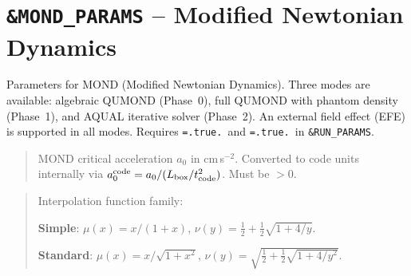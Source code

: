 \section{\texttt{\&MOND\_PARAMS} -- Modified Newtonian Dynamics}
\label{sec:mond_params}

Parameters for MOND (Modified Newtonian Dynamics).  Three modes
are available: algebraic QUMOND (Phase~0), full QUMOND with phantom
density (Phase~1), and AQUAL iterative solver (Phase~2).
An external field effect (EFE) is supported in all modes.
Requires \texttt{=.true.}\ and
\texttt{=.true.}\ in \texttt{\&RUN\_PARAMS}.

\label{param:a0_mond}

\begin{quote}
MOND critical acceleration $a_0$ in cm\,s$^{-2}$.  Converted to code
units internally via $a_0^{\rm code} = a_0 / (L_{\rm box}/t_{\rm code}^2)$.
Must be $> 0$.
\end{quote}

\label{param:mond_mu_type}

\begin{quote}
Interpolation function family:
\begin{description}[style=nextline,leftmargin=2cm,font=\ttfamily]
  \item[1] \textbf{Simple}: $\mu(x) = x/(1+x)$, \;
    $\nu(y) = \tfrac{1}{2} + \tfrac{1}{2}\sqrt{1 + 4/y}$.
  \item[2] \textbf{Standard}: $\mu(x) = x/\sqrt{1+x^2}$, \;
    $\nu(y) = \sqrt{\tfrac{1}{2} + \tfrac{1}{2}\sqrt{1 + 4/y^2}}$.
\end{description}
\end{quote}

\label{param:mond_type}

